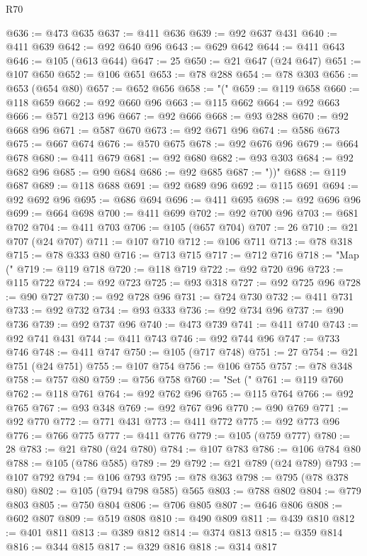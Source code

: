 \begin{lexlean}{R70}
\begin{coremodule}
@636 := @473 @635
@637 := @411 @636
@639 := @92 @637 @431
@640 := @411 @639
@642 := @92 @640 @96
@643 := @629 @642
@644 := @411 @643
@646 := @105 (@613 @644)
@647 := 25
@650 := @21 @647 (@24 @647)
@651 := @107 @650
@652 := @106 @651
@653 := @78 @288
@654 := @78 @303
@656 := @653 (@654 @80)
@657 := @652 @656
@658 := "("
@659 := @119 @658
@660 := @118 @659
@662 := @92 @660 @96
@663 := @115 @662
@664 := @92 @663
@666 := @571 @213 @96
@667 := @92 @666
@668 := @93 @288
@670 := @92 @668 @96
@671 := @587 @670
@673 := @92 @671 @96
@674 := @586 @673
@675 := @667 @674
@676 := @570 @675
@678 := @92 @676 @96
@679 := @664 @678
@680 := @411 @679
@681 := @92 @680
@682 := @93 @303
@684 := @92 @682 @96
@685 := @90 @684
@686 := @92 @685
@687 := "))"
@688 := @119 @687
@689 := @118 @688
@691 := @92 @689 @96
@692 := @115 @691
@694 := @92 @692 @96
@695 := @686 @694
@696 := @411 @695
@698 := @92 @696 @96
@699 := @664 @698
@700 := @411 @699
@702 := @92 @700 @96
@703 := @681 @702
@704 := @411 @703
@706 := @105 (@657 @704)
@707 := 26
@710 := @21 @707 (@24 @707)
@711 := @107 @710
@712 := @106 @711
@713 := @78 @318
@715 := @78 @333 @80
@716 := @713 @715
@717 := @712 @716
@718 := "Map ("
@719 := @119 @718
@720 := @118 @719
@722 := @92 @720 @96
@723 := @115 @722
@724 := @92 @723
@725 := @93 @318
@727 := @92 @725 @96
@728 := @90 @727
@730 := @92 @728 @96
@731 := @724 @730
@732 := @411 @731
@733 := @92 @732
@734 := @93 @333
@736 := @92 @734 @96
@737 := @90 @736
@739 := @92 @737 @96
@740 := @473 @739
@741 := @411 @740
@743 := @92 @741 @431
@744 := @411 @743
@746 := @92 @744 @96
@747 := @733 @746
@748 := @411 @747
@750 := @105 (@717 @748)
@751 := 27
@754 := @21 @751 (@24 @751)
@755 := @107 @754
@756 := @106 @755
@757 := @78 @348
@758 := @757 @80
@759 := @756 @758
@760 := "Set ("
@761 := @119 @760
@762 := @118 @761
@764 := @92 @762 @96
@765 := @115 @764
@766 := @92 @765
@767 := @93 @348
@769 := @92 @767 @96
@770 := @90 @769
@771 := @92 @770
@772 := @771 @431
@773 := @411 @772
@775 := @92 @773 @96
@776 := @766 @775
@777 := @411 @776
@779 := @105 (@759 @777)
@780 := 28
@783 := @21 @780 (@24 @780)
@784 := @107 @783
@786 := @106 @784 @80
@788 := @105 (@786 @585)
@789 := 29
@792 := @21 @789 (@24 @789)
@793 := @107 @792
@794 := @106 @793
@795 := @78 @363
@798 := @795 (@78 @378 @80)
@802 := @105 (@794 @798 @585) @565
@803 := @788 @802
@804 := @779 @803
@805 := @750 @804
@806 := @706 @805
@807 := @646 @806
@808 := @602 @807
@809 := @519 @808
@810 := @490 @809
@811 := @439 @810
@812 := @401 @811
@813 := @389 @812
@814 := @374 @813
@815 := @359 @814
@816 := @344 @815
@817 := @329 @816
@818 := @314 @817

\end{coremodule}
\end{lexlean}
